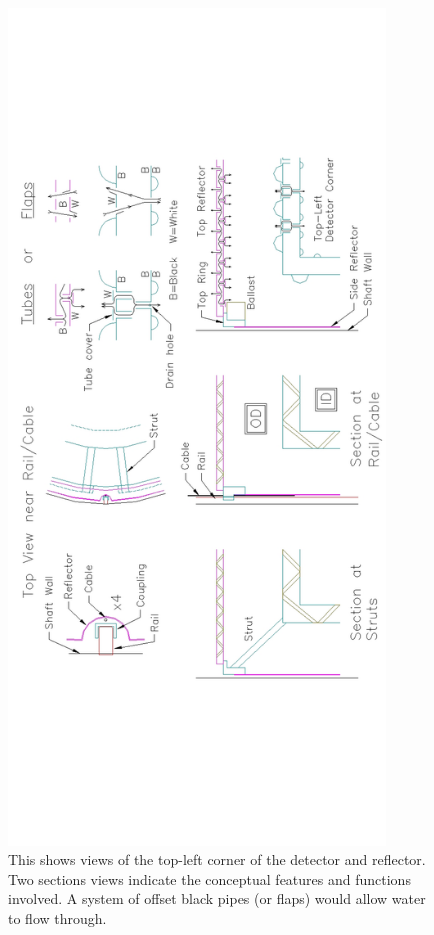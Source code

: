 \begin{figure}[hptb]
\centering\includegraphics[bb=0 350 900 1750,clip,angle=270,width=10cm]{figures/fig3-2.jpg}
\caption{This shows views of the top-left corner of the detector and reflector. Two 
sections views indicate the conceptual features and functions involved. A system of
 offset black pipes (or flaps) would allow water to flow through.}
\label{fig:detcomp}
\end{figure}


